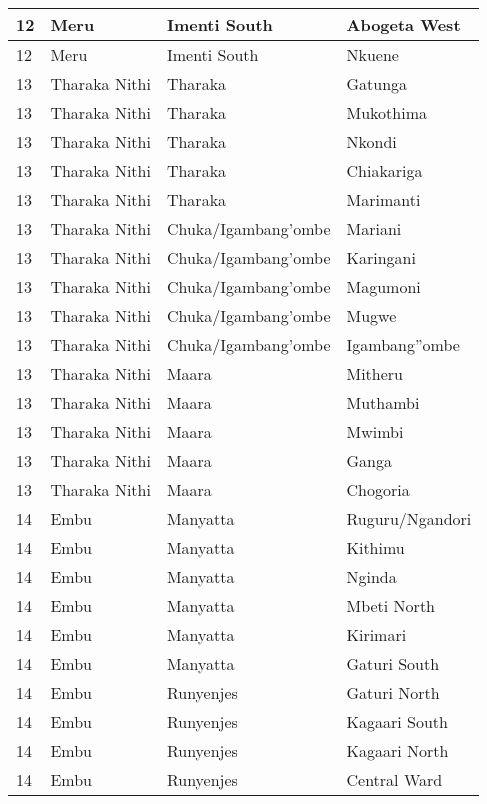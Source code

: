 \begin{table}[!ht]
\begin{tabular}{|l|l|l|l|}
        12 & Meru & Imenti South & Abogeta West \\ \hline
        12 & Meru & Imenti South & Nkuene \\ \hline
        13 & Tharaka Nithi & Tharaka  & Gatunga \\ \hline
        13 & Tharaka Nithi & Tharaka  & Mukothima \\ \hline
        13 & Tharaka Nithi & Tharaka  & Nkondi \\ \hline
        13 & Tharaka Nithi & Tharaka  & Chiakariga \\ \hline
        13 & Tharaka Nithi & Tharaka  & Marimanti \\ \hline
        13 & Tharaka Nithi & Chuka/Igambang’ombe & Mariani \\ \hline
        13 & Tharaka Nithi & Chuka/Igambang’ombe & Karingani \\ \hline
        13 & Tharaka Nithi & Chuka/Igambang’ombe & Magumoni \\ \hline
        13 & Tharaka Nithi & Chuka/Igambang’ombe & Mugwe \\ \hline
        13 & Tharaka Nithi & Chuka/Igambang’ombe & Igambang''ombe \\ \hline
        13 & Tharaka Nithi & Maara & Mitheru \\ \hline
        13 & Tharaka Nithi & Maara & Muthambi \\ \hline
        13 & Tharaka Nithi & Maara & Mwimbi \\ \hline
        13 & Tharaka Nithi & Maara & Ganga \\ \hline
        13 & Tharaka Nithi & Maara & Chogoria \\ \hline
        14 & Embu & Manyatta & Ruguru/Ngandori \\ \hline
        14 & Embu & Manyatta & Kithimu \\ \hline
        14 & Embu & Manyatta & Nginda \\ \hline
        14 & Embu & Manyatta & Mbeti North \\ \hline
        14 & Embu & Manyatta & Kirimari \\ \hline
        14 & Embu & Manyatta & Gaturi South \\ \hline
        14 & Embu & Runyenjes & Gaturi North \\ \hline
        14 & Embu & Runyenjes & Kagaari South \\ \hline
        14 & Embu & Runyenjes & Kagaari North \\ \hline
        14 & Embu & Runyenjes & Central Ward \\ \hline

\end{tabular}
\end{table}
